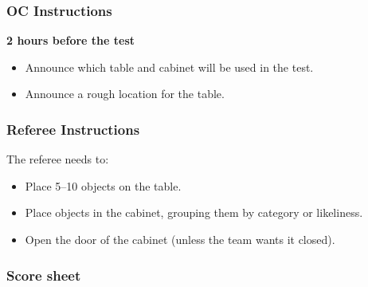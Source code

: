 \subsubsection*{OC Instructions}

\textbf{2 hours before the test}
\begin{itemize}
	\item Announce which table and cabinet will be used in the test.
	\item Announce a rough location for the table.
\end{itemize}

\subsubsection*{Referee Instructions}

The referee needs to:
\begin{itemize}
	\item Place 5--10 objects on the table.
	\item Place objects in the cabinet, grouping them by category or likeliness.
	\item Open the door of the cabinet (unless the team wants it closed).
\end{itemize}


\newpage
\subsubsection*{Score sheet}
%


